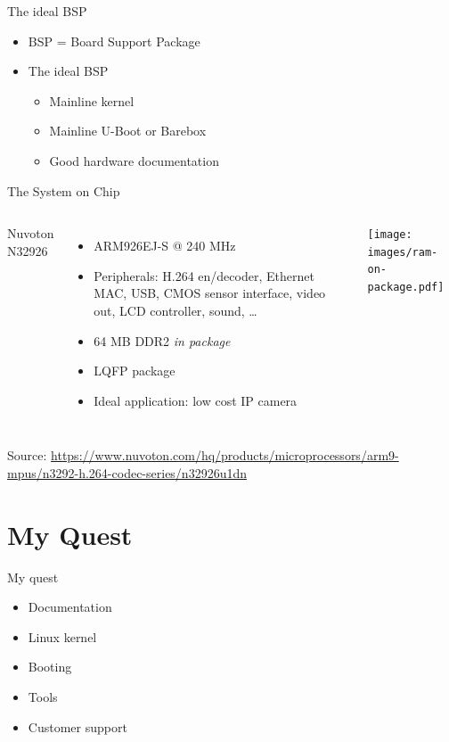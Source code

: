\documentclass[xetex,table,aspectratio=169]{beamer}
\begin{document}
\begin{frame}{The ideal BSP}
  \begin{itemize}
  \item BSP = Board Support Package
  \item The ideal BSP
    \begin{itemize}
    \item Mainline kernel
    \item Mainline U-Boot or Barebox
    \item Good hardware documentation
    \end{itemize}
  \end{itemize}
\end{frame}

\begin{frame}{The System on Chip}
  \begin{columns}
    Nuvoton N32926
    \begin{itemize}
    \item ARM926EJ-S @ 240 MHz
    \item Peripherals: H.264 en/decoder, Ethernet MAC, USB, CMOS
      sensor interface, video out, LCD controller, sound, \dots
    \item 64 MB DDR2 {\em in package}
    \item LQFP package
    \item Ideal application: low cost IP camera
    \end{itemize}

    \texttt{[image: images/ram-on-package.pdf]}
  \end{columns}

  {\tiny Source:
    \url{https://www.nuvoton.com/hq/products/microprocessors/arm9-mpus/n3292-h.264-codec-series/n32926u1dn}}
\end{frame}

\section{My Quest}

\begin{frame}{My quest}
  \begin{itemize}
  \item Documentation
  \item Linux kernel
  \item Booting
  \item Tools
  \item Customer support
  \end{itemize}
\end{frame}
\end{document}
